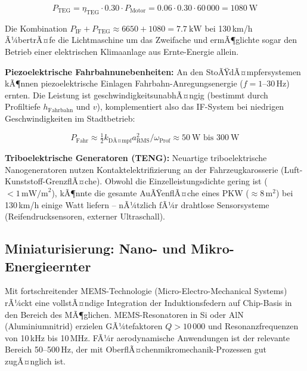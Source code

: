 ﻿\documentclass[12pt, a4paper]{report}
\theoremstyle{definition}
\theoremstyle{remark}
\begin{document}
\begin{equation}
  P_{\text{TEG}} = \eta_{\text{TEG}} \cdot 0.30 \cdot P_{\text{Motor}}
  = 0.06 \cdot 0.30 \cdot 60\,000 = \SI{1080}{\watt}
  \label{eq:p_teg}
\end{equation}

Die Kombination $P_{\text{IF}} + P_{\text{TEG}} \approx 6650 + 1080 = \SI{7.7}{\kilo\watt}$
bei 130\,km/h Ã¼bertrÃ¤fe die Lichtmaschine um das Zweifache und ermÃ¶glichte
sogar den Betrieb einer elektrischen Klimaanlage aus Ernte-Energie allein.

\textbf{Piezoelektrische Fahrbahnunebenheiten:}
An den StoÃŸdÃ¤mpfersystemen kÃ¶nnen piezoelektrische Einlagen
Fahrbahn-Anregungsenergie ($f = 1$--$30\,\text{Hz}$) ernten. Die Leistung
ist geschwindigkeitsunabhÃ¤ngig (bestimmt durch Profiltiefe $h_{\text{Fahrbahn}}$
und $v$), komplementiert also das IF-System bei niedrigen Geschwindigkeiten
im Stadtbetrieb:

\begin{equation}
  P_{\text{Fahr}} \approx \tfrac{1}{2} k_{\text{DÃ¤mpf}} a_{\text{RMS}}^2 / \omega_{\text{Prof}}
  \approx \SI{50}{\watt}\text{ bis }\SI{300}{\watt}
  \label{eq:p_fahrbahn}
\end{equation}

\textbf{Triboelektrische Generatoren (TENG):}
Neuartige triboelektrische Nano\-generatoren nutzen Kontaktelektrifizierung
an der Fahrzeugkarosserie (Luft-Kunststoff-GrenzflÃ¤che). Obwohl die
Einzelleistungsdichte gering ist ($< 1\,\text{mW/m}^2$), kÃ¶nnte die gesamte
AuÃŸenflÃ¤che eines PKW ($\approx 8\,\text{m}^2$) bei 130\,km/h einige Watt
liefern -- nÃ¼tzlich fÃ¼r drahtlose Sensorsysteme (Reifendrucksensoren,
externer Ultraschall).

\subsection{Miniaturisierung: Nano- und Mikro-Energieernter}
\label{ssec:ausblick_mems}

Mit fortschreitender MEMS-Technologie (Micro-Electro-Mechanical Systems)
rÃ¼ckt eine vollstÃ¤ndige Integration der Induktionsfedern auf Chip-Basis
in den Bereich des MÃ¶glichen. MEMS-Resonatoren in Si oder AlN
(Aluminiumnitrid) erzielen GÃ¼tefaktoren $Q > 10\,000$ und Resonanz\-frequenzen
von 10\,kHz bis 10\,MHz. FÃ¼r aerodynamische Anwendungen ist der relevante
Bereich 50--500\,Hz, der mit OberflÃ¤chenmikromechanik-Prozessen gut zugÃ¤nglich ist.
\end{document}
